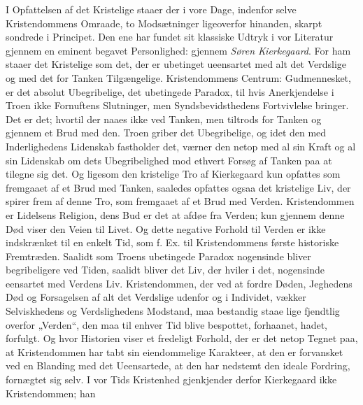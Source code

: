 \documentclass[12pt,a4paper,openany]{book}
\newcommand{\opage}[1]{\marginnote{\footnotesize\textit{[#1]}}}
\begin{document}
I Opfattelsen af det Kristelige staaer der i vore Dage,
indenfor selve Kristendommens Omraade, to Modsætninger
ligeoverfor hinanden, skarpt sondrede i Principet. Den ene
har fundet sit klassiske Udtryk i vor Literatur gjennem en
eminent begavet Personlighed: gjennem \emph{Søren Kierkegaard}.
For ham staaer det Kristelige som det, der er
ubetinget ueensartet med alt det Verdslige og med det for
Tanken Tilgængelige. Kristendommens Centrum: Gudmennesket,
er det absolut Ubegribelige, det ubetingede
Paradox, til hvis Anerkjendelse i Troen ikke Fornuftens
Slutninger, men Syndsbevidsthedens Fortvivlelse bringer.
Det er det; hvortil der naaes ikke ved Tanken, men tiltrods
for Tanken og gjennem et Brud med den. Troen
griber det Ubegribelige, og idet den med Inderlighedens
Lidenskab fastholder det, værner den netop med al sin Kraft
og al sin Lidenskab om dets Ubegribelighed mod ethvert
Forsøg af Tanken paa at tilegne sig det. Og ligesom den
kristelige Tro af Kierkegaard kun opfattes som fremgaaet af
et Brud med Tanken, saaledes opfattes ogsaa det kristelige
Liv, der spirer frem af denne Tro, som fremgaaet af et
\opage{434}Brud med Verden. Kristendommen er Lidelsens Religion,
dens Bud er det at afdøe fra Verden; kun gjennem denne
Død viser den Veien til Livet. Og dette negative Forhold
til Verden er ikke indskrænket til en enkelt Tid, som f. Ex.
til Kristendommens første historiske Fremtræden. Saalidt
som Troens ubetingede Paradox nogensinde bliver begribeligere
ved Tiden, saalidt bliver det Liv, der hviler i det, nogensinde
eensartet med Verdens Liv. Kristendommen, der ved
at fordre Døden, Jeghedens Død og Forsagelsen af alt det
Verdslige udenfor og i Individet, vækker Selviskhedens og
Verdslighedens Modstand, maa bestandig staae lige fjendtlig
overfor „Verden“, den maa til enhver Tid blive bespottet,
forhaanet, hadet, forfulgt. Og hvor Historien viser et fredeligt
Forhold, der er det netop Tegnet paa, at Kristendommen
har tabt sin eiendommelige Karakteer, at den er forvansket
ved en Blanding med det Ueensartede, at den har nedstemt
den ideale Fordring, fornægtet sig selv. I vor Tids Kristenhed
gjenkjender derfor Kierkegaard ikke Kristendommen; han
\end{document}
